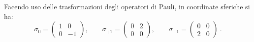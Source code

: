 Facendo uso delle trasformazioni degli operatori di Pauli, in coordinate sferiche si ha:
\begin{equation*}
    \boxed{
        \sigma_0=\begin{pmatrix}
            1&0\\
            0&-1
        \end{pmatrix},\qquad
        \sigma_{+1}=\begin{pmatrix}
            0&2\\
            0&0
        \end{pmatrix},\qquad
        \sigma_{-1}=\begin{pmatrix}
            0&0\\
            2&0
        \end{pmatrix}
    }\ .
\end{equation*}
